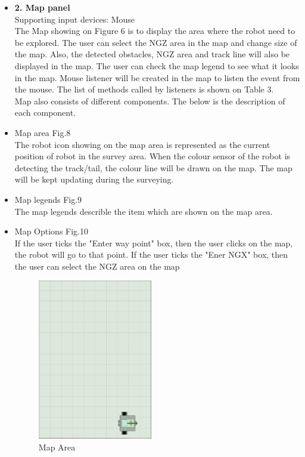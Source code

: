 \begin{itemize}
	\item \textbf{2. Map panel}\\
	Supporting input devices: Mouse\\
	The Map showing on Figure 6 is to display the area where the robot need to be explored. The user can select the NGZ area in the map and change size of the map. Also, the detected obstacles, NGZ area and track line will also be displayed in the map. The user can check the map legend to see what it looks in the map. Mouse listener will be created in the map to listen the event from the mouse. The list of methods called by listeners is shown on Table 3.\\
	Map also consists of different components. The below is the description of each component.
	\\
	\item Map area Fig.8\\
	The robot icon showing on the map area is represented as the current position of robot in the survey area. When the colour sensor of the robot is detecting the track/tail, the colour line will be drawn on the map. The map will be kept updating during the surveying.
	\\
	\item Map legends Fig.9\\
	The map legends describle the item which are shown on the map area.
	\\
	\item Map Options Fig.10\\
	If the user ticks the "Enter way point" box, then the user clicks on the map, the robot will go to that point. If the user ticks the "Ener NGX" box, then the user can select the NGZ area on the map\newline
	
\begin{figure}[H]
	\includegraphics[width=50mm]{MapArea.PNG}  
	\caption{Map Area}
	\label{fig:Map Area}				
\end{figure}	


\end{itemize}
